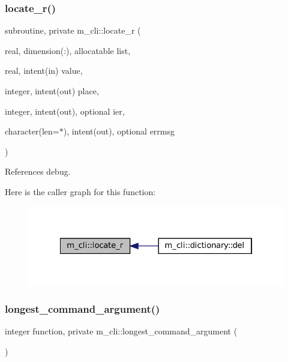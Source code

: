 \subsubsection{\texorpdfstring{locate\+\_\+r()}{locate\_r()}}
{\footnotesize\ttfamily subroutine, private m\+\_\+cli\+::locate\+\_\+r (\begin{DoxyParamCaption}\item[{real, dimension(\+:), allocatable}]{list,  }\item[{real, intent(in)}]{value,  }\item[{integer, intent(out)}]{place,  }\item[{integer, intent(out), optional}]{ier,  }\item[{character(len=$\ast$), intent(out), optional}]{errmsg }\end{DoxyParamCaption})\hspace{0.3cm}{\ttfamily [private]}}



References debug.

Here is the caller graph for this function\+:
\nopagebreak
\begin{figure}[H]
\begin{center}
\leavevmode
\includegraphics[width=322pt]{namespacem__cli_ac44389e115b536069f324bffea7d2469_icgraph}
\end{center}
\end{figure}
\mbox{\label{namespacem__cli_aaf5504d3b48696a9d22fa5773c5a7d15}} 
\subsubsection{\texorpdfstring{longest\+\_\+command\+\_\+argument()}{longest\_command\_argument()}}
{\footnotesize\ttfamily integer function, private m\+\_\+cli\+::longest\+\_\+command\+\_\+argument (\begin{DoxyParamCaption}{ }\end{DoxyParamCaption})\hspace{0.3cm}{\ttfamily [private]}}

